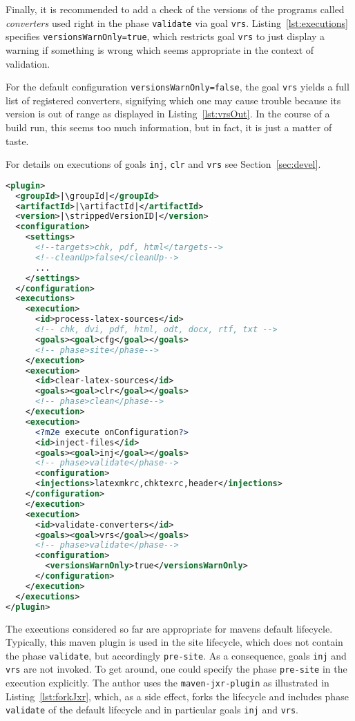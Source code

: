 Finally, it is recommended to add a check of the versions of the programs called \emph{converters} used 
right in the phase \texttt{validate} via goal \texttt{vrs}.
Listing~\ref{lst:executions} specifies \texttt{versionsWarnOnly=true}, 
which restricts goal \texttt{vrs} to just display a warning 
if something is wrong 
which seems appropriate in the context of validation. 

For the default configuration \texttt{versionsWarnOnly=false}, 
the goal \texttt{vrs} 
yields a full list of registered converters, 
signifying which one may cause trouble 
because its version is out of range
as displayed in Listing~\ref{lst:vrsOut}. 
In the course of a build run, this seems too much information, 
but in fact, it is just a matter of taste. 

For details on executions of goals \texttt{inj}, \texttt{clr} and \texttt{vrs} 
see Section~\ref{sec:devel}. 


\begin{lstlisting}[language=XML, basicstyle=\footnotesize,
escapechar=|,
float, captionpos=hb, label={lst:executions}, 
caption={The executions of this plugin}]
<plugin>
  <groupId>|\groupId|</groupId>
  <artifactId>|\artifactId|</artifactId>
  <version>|\strippedVersionID|</version>
  <configuration>
    <settings>
      <!--targets>chk, pdf, html</targets-->
      <!--cleanUp>false</cleanUp-->
      ...
    </settings>
  </configuration>
  <executions>
    <execution>
      <id>process-latex-sources</id>
      <!-- chk, dvi, pdf, html, odt, docx, rtf, txt -->
      <goals><goal>cfg</goal></goals>
      <!-- phase>site</phase-->
    </execution>
    <execution>
      <id>clear-latex-sources</id>
      <goals><goal>clr</goal></goals>
      <!-- phase>clean</phase-->
    </execution>
    <execution>
      <?m2e execute onConfiguration?>
      <id>inject-files</id>
      <goals><goal>inj</goal></goals>
      <!-- phase>validate</phase-->
      <configuration>
      <injections>latexmkrc,chktexrc,header</injections>
    </configuration>
    </execution>
    <execution>
      <id>validate-converters</id>
      <goals><goal>vrs</goal></goals>
      <!-- phase>validate</phase-->
      <configuration>
        <versionsWarnOnly>true</versionsWarnOnly>
      </configuration>
    </execution>
  </executions>
</plugin>
\end{lstlisting}

The executions considered so far are appropriate 
for mavens default lifecycle. 
Typically, this maven plugin is used in the site lifecycle, 
which does not contain the phase \texttt{validate}, 
but accordingly \texttt{pre-site}. 
As a consequence, goals \texttt{inj} and \texttt{vrs} are not invoked. 
To get around, 
one could specify the phase \texttt{pre-site} in the execution explicitly. 
The author uses the \texttt{maven-jxr-plugin} 
as illustrated in Listing~\ref{lst:forkJxr}, 
which, as a side effect, forks the lifecycle 
and includes phase \texttt{validate} of the default lifecycle 
and in particular goals \texttt{inj} and \texttt{vrs}. 

